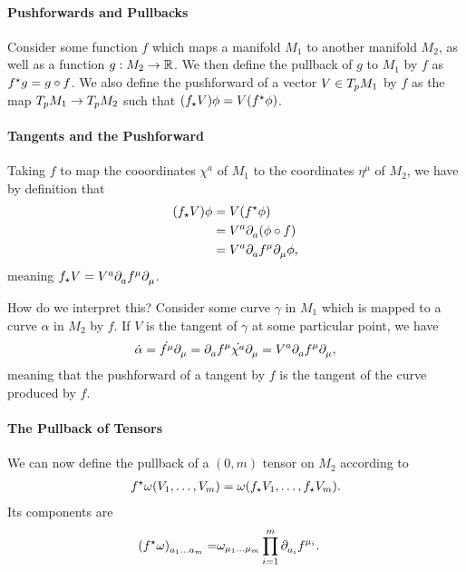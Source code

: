 \paragraph{Pushforwards and Pullbacks}
Consider some function $f$ which maps a manifold $M_{1}$ to another manifold $M_{2}$, as well as a function $g: M_{2}\to\mathbb{R}$. We then define the pullback of $g$ to $M_{1}$ by $f$ as $f^{\star}g = g\circ f$. We also define the pushforward of a vector $V\in T_{p}M_{1}$ by $f$ as the map $T_{p}M_{1}\to T_{p}M_{2}$ such that $(f_{\star}V)\phi = V(f^{\star}\phi)$.

\paragraph{Tangents and the Pushforward}
Taking $f$ to map the cooordinates $\chi^{a}$ of $M_{1}$ to the coordinates $\eta^{\mu}$ of $M_{2}$, we have by definition that
\begin{align*}
	(f_{\star}V)\phi &= V(f^{\star}\phi) \\
	                 &= V^{a}\partial^{}_{a}{(\phi\circ f)} \\
	                 &= V^{a}\partial^{}_{a}{f^{\mu}}\partial^{}_{\mu}{\phi},
\end{align*}
meaning $f_{\star}V = V^{a}\partial^{}_{a}f^{\mu}\partial^{}_{\mu}$.

How do we interpret this? Consider some curve $\gamma$ in $M_{1}$ which is mapped to a curve $\alpha$ in $M_{2}$ by $f$. If $V$ is the tangent of $\gamma$ at some particular point, we have
\begin{align*}
	\dot{\alpha} = \dot{f^{\mu}}\partial^{}_{\mu} = \partial^{}_{a}{f^{\mu}}\dot{\chi^{a}}\partial^{}_{\mu} = V^{a}\partial^{}_{a}{f^{\mu}}\partial^{}_{\mu},
\end{align*}
meaning that the pushforward of a tangent by $f$ is the tangent of the curve produced by $f$.

\paragraph{The Pullback of Tensors}
We can now define the pullback of a $(0, m)$ tensor on $M_{2}$ according to
\begin{align*}
	f^{\star}\omega(V_{1}, \dots, V_{m}) = \omega(f_{\star}V_{1}, \dots, f_{\star}V_{m}).
\end{align*}
Its components are
\begin{align*}
	\tensor{(\pub{f}{\omega})}{_{a_{1}\dots a_{m}}} =& \omega_{\mu_{1}\dots\mu_{m}}\prod\limits_{i = 1}^{m}\del{}{a_{i}}{f^{\mu_{i}}}.
\end{align*}

